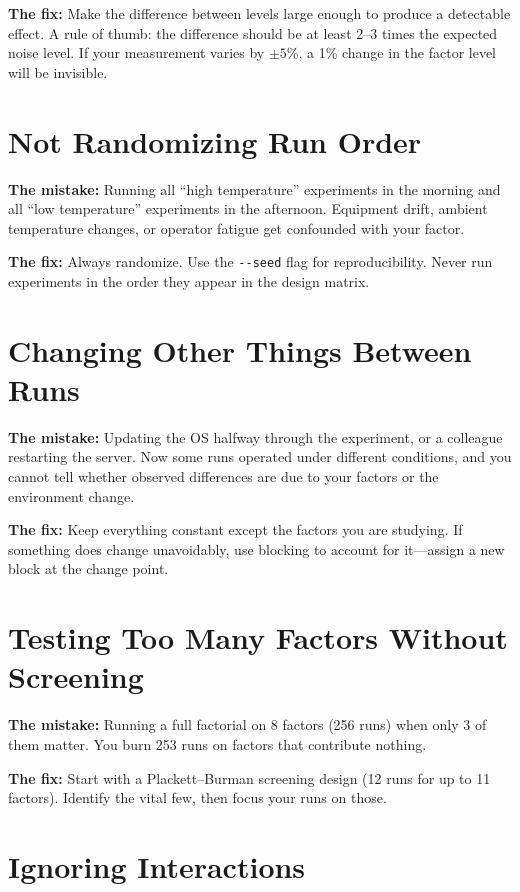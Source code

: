\documentclass[11pt]{book}
\begin{document}
\textbf{The fix:} Make the difference between levels large enough to produce a
detectable effect. A rule of thumb: the difference should be at least 2--3 times
the expected noise level. If your measurement varies by $\pm 5$\%, a 1\% change
in the factor level will be invisible.

\section{Not Randomizing Run Order}

\textbf{The mistake:} Running all ``high temperature'' experiments in the
morning and all ``low temperature'' experiments in the afternoon. Equipment
drift, ambient temperature changes, or operator fatigue get confounded with
your factor.

\textbf{The fix:} Always randomize. Use the \texttt{-{}-seed} flag for
reproducibility. Never run experiments in the order they appear in the design
matrix.

\section{Changing Other Things Between Runs}

\textbf{The mistake:} Updating the OS halfway through the experiment, or a
colleague restarting the server. Now some runs operated under different
conditions, and you cannot tell whether observed differences are due to your
factors or the environment change.

\textbf{The fix:} Keep everything constant except the factors you are studying.
If something does change unavoidably, use blocking to account for it---assign
a new block at the change point.

\section{Testing Too Many Factors Without Screening}

\textbf{The mistake:} Running a full factorial on 8 factors (256 runs) when only
3 of them matter. You burn 253 runs on factors that contribute nothing.

\textbf{The fix:} Start with a Plackett--Burman screening design (12 runs for
up to 11 factors). Identify the vital few, then focus your runs on those.

\section{Ignoring Interactions}
\end{document}
